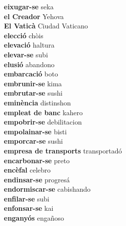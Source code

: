 \textbf{ eixugar-se  } seka \\
\textbf{ el Creador  } Yehova \\
\textbf{ El Vaticà  } Ciudad Vaticano \\
\textbf{ elecció  } chòis \\
\textbf{ elevació  } haltura \\
\textbf{ elevar-se  } subi \\
\textbf{ elusió  } abandono \\
\textbf{ embarcació  } boto \\
\textbf{ embrunir-se  } kima \\
\textbf{ embrutar-se  } sushi \\
\textbf{ eminència  } distinshon \\
\textbf{ empleat de banc  } kahero \\
\textbf{ empobrir-se  } debilitacion \\
\textbf{ empolainar-se  } bisti \\
\textbf{ emporcar-se  } sushi \\
\textbf{ empresa de transports  } transportadó \\
\textbf{ encarbonar-se  } preto \\
\textbf{ encèfal  } celebro \\
\textbf{ endinsar-se  } progresá \\
\textbf{ endormiscar-se  } cabishando \\
\textbf{ enfilar-se  } subi \\
\textbf{ enfonsar-se  } kai \\
\textbf{ enganyós  } engañoso \\
